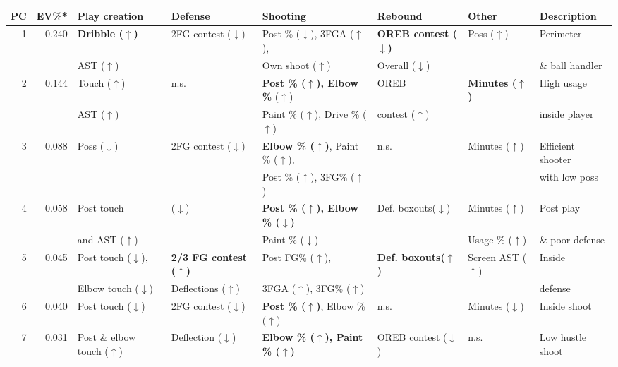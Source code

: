 \begin{tabular}{rrllllll}
\toprule
PC & EV\%* & Play creation & Defense & Shooting & Rebound & Other & Description \\
\midrule
\multirow{2}{*}{1} & \multirow{2}{*}{0.240} & \textbf{Dribble ($\uparrow$)} & \multirow{2}{*}{2FG contest ($\downarrow$)} & Post \% ($\downarrow$), 3FGA ($\uparrow$), & \textbf{OREB contest ($\downarrow$)} & \multirow{2}{*}{Poss ($\uparrow$)} & Perimeter  \\
& & AST ($\uparrow$) & & Own shoot ($\uparrow$) & Overall ($\downarrow$) & & \& ball handler \\
\midrule
\multirow{2}{*}{2} & \multirow{2}{*}{0.144} & Touch ($\uparrow$) & \multirow{2}{*}{n.s.} & \textbf{Post \% ($\uparrow$), Elbow \%} ($\uparrow$) & OREB & \multirow{2}{*}{\textbf{Minutes ($\uparrow$)}} & High usage \\
& & AST ($\uparrow$) & & Paint \% ($\uparrow$), Drive \% ($\uparrow$) & contest ($\uparrow$) & & inside player \\
\midrule
\multirow{2}{*}{3} & \multirow{2}{*}{0.088}& \multirow{2}{*}{Poss ($\downarrow$)} & \multirow{2}{*}{2FG contest ($\downarrow$)} & {\bf Elbow \% ($\uparrow$)}, Paint \% ($\uparrow$), & \multirow{2}{*}{n.s.} & \multirow{2}{*}{Minutes ($\uparrow$)} & Efficient shooter  \\
& & & & Post \% ($\uparrow$), 3FG\% ($\uparrow$) &  & & with low poss \\
\midrule
\multirow{2}{*}{4} & \multirow{2}{*}{0.058} & Post touch & \multirow{2}{*}{($\downarrow$)} & {\bf Post \% ($\uparrow$), Elbow \% ($\downarrow$) }& \multirow{2}{*}{Def. boxouts($\downarrow$)} & Minutes ($\uparrow$) & Post play  \\
& & and AST ($\uparrow$) & & Paint \% ($\downarrow$) &  & Usage \% ($\uparrow$) & \& poor defense \\
\midrule
\multirow{2}{*}{5} & \multirow{2}{*}{0.045} & Post touch ($\downarrow$), & {\bf 2/3 FG contest ($\uparrow$)} & Post FG\% ($\uparrow$),  & \multirow{2}{*}{\bf Def. boxouts($\uparrow$)} & \multirow{2}{*}{Screen AST ($\uparrow$)} & Inside  \\ 
& & Elbow touch ($\downarrow$) & Deflections ($\uparrow$) & 3FGA ($\uparrow$), 3FG\% ($\uparrow$) &  &  & defense \\
\midrule
6 & 0.040 & Post touch ($\downarrow$) & 2FG contest ($\downarrow$) & \textbf{Post \% ($\uparrow$)}, Elbow \% ($\uparrow$) & n.s. & Minutes ($\downarrow$) & Inside shoot \\ 
\midrule
7 & 0.031 & Post \& elbow touch ($\uparrow$) & Deflection ($\downarrow$) & \textbf{Elbow \% ($\uparrow$), Paint \% ($\uparrow$)} & OREB contest ($\downarrow$) & n.s. & Low hustle shoot \\ 

\end{tabular}
